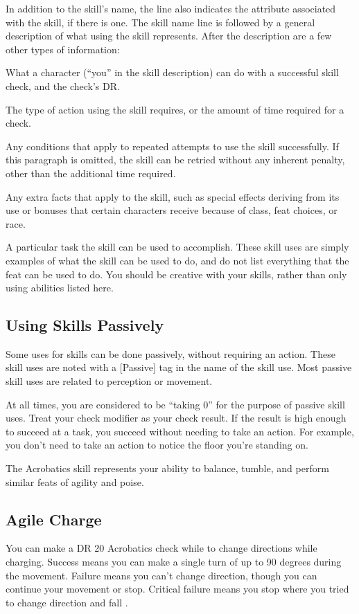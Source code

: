     In addition to the skill's name, the line also indicates the attribute associated with the skill, if there is one.
    The skill name line is followed by a general description of what using the skill represents. After the description are a few other types of information:

     What a character (``you'' in the skill description) can do with a successful skill check, and the check's DR\@.

     The type of action using the skill requires, or the amount of time required for a check.

     Any conditions that apply to repeated attempts to use the skill successfully. If this paragraph is omitted, the skill can be retried without any inherent penalty, other than the additional time required.

     Any extra facts that apply to the skill, such as special effects deriving from its use or bonuses that certain characters receive because of class, feat choices, or race.

     A particular task the skill can be used to accomplish.
    These skill uses are simply examples of what the skill can be used to do, and do not list everything that the feat can be used to do.
    You should be creative with your skills, rather than only using abilities listed here.

    \subsection{Using Skills Passively}\label{Using Skills Passively}
    Some uses for skills can be done passively, without requiring an action.
    These skill uses are noted with a [Passive] tag in the name of the skill use.
    Most passive skill uses are related to perception or movement.

    At all times, you are considered to be ``taking 0'' for the purpose of passive skill uses.
    Treat your check modifier as your check result.
    If the result is high enough to succeed at a task, you succeed without needing to take an action.
    For example, you don't need to take an action to notice the floor you're standing on.

        The Acrobatics skill represents your ability to balance, tumble, and perform similar feats of agility and poise.

    \subsection{Agile Charge}
        You can make a DR 20 Acrobatics check while  to change directions while charging.
        Success means you can make a single turn of up to 90 degrees during the movement.
        Failure means you can't change direction, though you can continue your movement or stop.
        Critical failure means you stop where you tried to change direction and fall \prone.

